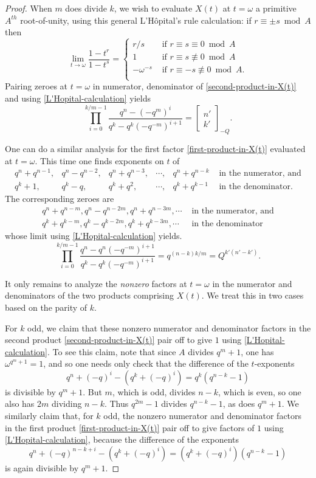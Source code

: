 \documentclass[10pt]{amsart}
\theoremstyle{plain}
\theoremstyle{definition}
\theoremstyle{remark}
\numberwithin{equation}{section}
\newcommand\qbin[3]{\left[\begin{matrix} #1 \\ #2 \end{matrix} \right]_{#3}}
\begin{document}
\begin{proof}
When $m$ does divide $k$, we wish to evaluate $X(t)$
at $t=\omega$ a primitive $A^{th}$ root-of-unity, 
using this general L'H\^opital's rule calculation: if $r \equiv \pm s \bmod{A}$ then
\begin{equation}
\label{L'Hopital-calculation}
\lim_{t \rightarrow \omega} \frac{1-t^r}{1-t^s} =
\begin{cases}
r/s & \text{ if }r \equiv s \equiv 0  \bmod{A}\\
1           & \text{ if }r \equiv s \not\equiv 0  \bmod{A}\\
-\omega^{-s} & \text{ if }r \equiv -s \not\equiv 0  \bmod{A}.\\
\end{cases}
\end{equation}
Pairing zeroes at $t=\omega$ in numerator, denominator
of \eqref{second-product-in-X(t)} and 
using \eqref{L'Hopital-calculation} yields
$$
\prod_{i=0}^{k/m-1} \frac{q^n-(-q^m)^i}{q^k-q^k(-q^{-m})^{i+1}}=
\qbin{n'}{k'}{-Q}.
$$

One can do a similar analysis for the first factor  \eqref{first-product-in-X(t)}
evaluated at $t=\omega$.  This time one finds exponents on $t$ of
$$
\begin{array}{llllll}
q^{n}+q^{n-1}, & q^n-q^{n-2}, & q^n+q^{n-3}, &\cdots,  & q^n+q^{n-k}
&\text{ in the numerator, and}\\
q^k+1,       & q^k-q,      & q^k+q^2,  & \cdots, & q^k+q^{k-1}
&\text{ in the denominator.}
\end{array}
$$
The corresponding zeroes are 
$$
\begin{aligned}
q^n+q^{n-m}, q^n-q^{n-2m}, q^n+q^{n-3m}, \cdots
&\text{ in the numerator, and} \\
q^k+q^{k-m}, q^k-q^{k-2m}, q^k+q^{k-3m}, \cdots
&\text{ in the denominator}
\end{aligned}
$$
whose limit using \eqref{L'Hopital-calculation} yields.
$$
\prod_{i=0}^{k/m-1} \frac{q^n-q^n(-q^{-m})^{i+1}}
{q^k-q^k(-q^{-m})^{i+1}}=q^{(n-k)k/m}=Q^{k'(n'-k')}.
$$

It only remains to analyze the {\it nonzero} factors at $t=\omega$
in the numerator and denominators of the two products
comprising $X(t)$.  We treat this in two cases based on the parity of $k$.

For $k$ odd, we claim that these nonzero numerator and denominator
factors in the second product \eqref{second-product-in-X(t)} pair off 
to give $1$ using \eqref{L'Hopital-calculation}.  To see this claim,
note that since $A$ divides $q^m+1$, one has
$\omega^{q^m+1}=1$, and so one needs only check that the difference of the 
$t$-exponents 
$$
q^n+(-q)^i-(q^k+(-q)^i)=q^k(q^{n-k}-1)
$$ 
is divisible by $q^m+1$. But $m$, which is odd, 
divides $n-k$, which is even, so one also has $2m$ dividing $n-k$. 
Thus $q^{2m}-1$ divides $q^{n-k}-1$, as does $q^m+1$.
We similarly claim that, for $k$ odd, 
the nonzero numerator and denominator factors in the first product
\eqref{first-product-in-X(t)} pair off to give factors
of $1$ using \eqref{L'Hopital-calculation}, because 
the difference of the exponents 
$$
q^n+(-q)^{n-k+i}-(q^k+(-q)^i)=(q^k+(-q)^i)(q^{n-k}-1)
$$ 
is again divisible by $q^m+1$.


\end{proof}
\end{document}
